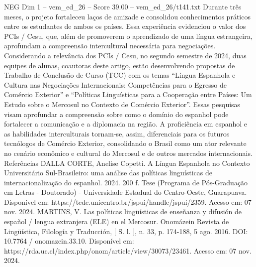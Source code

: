 \begin{textsample}{NEG Dim 1 – vem\_ed\_26 – Score 39.00 – vem\_ed\_26/t141.txt}
Durante três meses, o projeto fortaleceu laços de amizade e consolidou conhecimentos práticos entre os estudantes de ambos os países.
Essa experiência evidenciou o valor dos PCIs / Cesu, que, além de promoverem o aprendizado de uma língua estrangeira, aprofundam a compreensão intercultural necessária para negociações.
Considerando a relevância dos PCIs / Cesu, no segundo semestre de 2024, duas equipes de alunas, coautoras deste artigo, estão desenvolvendo propostas de Trabalho de Conclusão de Curso (TCC) com os temas “Língua Espanhola e Cultura nas Negociações Internacionais: Competências para o Egresso de Comércio Exterior” e “Políticas Linguísticas para a Cooperação entre Países: Um Estudo sobre o Mercosul no Contexto de Comércio Exterior”.
Essas pesquisas visam aprofundar a compreensão sobre como o domínio do espanhol pode fortalecer a comunicação e a diplomacia na região.
A proficiência em espanhol e as habilidades interculturais tornam-se, assim, diferenciais para os futuros tecnólogos de Comércio Exterior, consolidando o Brasil como um ator relevante no cenário econômico e cultural do Mercosul e de outros mercados internacionais.
Referências DALLA CORTE, Anelise Copetti.
A Língua Espanhola no Contexto Universitário Sul-Brasileiro: uma análise das políticas linguísticas de internacionalização do espanhol. 2024. 200 f.
Tese (Programa de Pós-Graduação em Letras - Doutorado) - Universidade Estadual do Centro-Oeste, Guarapuava.
Disponível em: https://tede.unicentro.br/jspui/handle/jspui/2359.
Acesso em: 07 nov. 2024.
MARTINS, V.
Las políticas lingüísticas de enseñanza y difusión de español / lengua extranjera (ELE) en el Mercosur.
Onomázein Revista de Lingüística, Filología y Traducción, [ S. l. ], n. 33, p. 174-188, 5 ago. 2016.
DOI: 10.7764 / onomazein.33.10.
Disponível em: https://rda.uc.cl/index.php/onom/article/view/30073/23461.
Acesso em: 07 nov. 2024.

\end{textsample}
